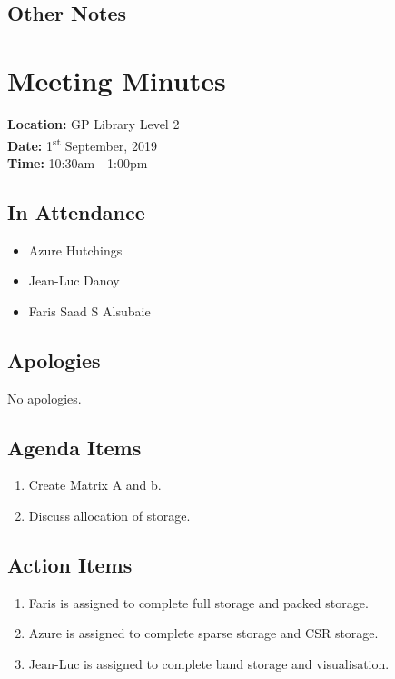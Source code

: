 \documentclass{article}
\begin{document}
\subsection*{Other Notes}

\pagebreak

\section{Meeting Minutes}
\textbf{Location:} GP Library Level 2 \\
\textbf{Date:} 1\textsuperscript{st} September, 2019 \\
\textbf{Time:} 10:30am - 1:00pm

\subsection*{In Attendance}
\begin{itemize}
\item Azure Hutchings
\item Jean-Luc Danoy
\item Faris Saad S Alsubaie
\end{itemize}

\subsection*{Apologies}
No apologies. 

\subsection*{Agenda Items}
\begin{enumerate}
\item Create Matrix A and b.
\item Discuss allocation of storage.
\end{enumerate}

\subsection*{Action Items}
\begin{enumerate}
\item Faris is assigned to complete full storage and packed storage.
\item Azure is assigned to complete sparse storage and CSR storage.
\item Jean-Luc is assigned to complete band storage and visualisation.
\end{enumerate}
\end{document}
